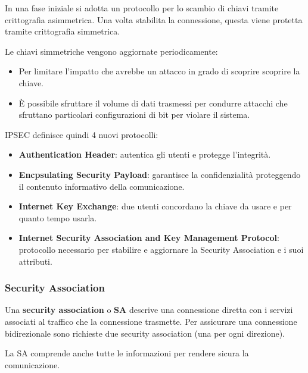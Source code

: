 In una fase iniziale si adotta un protocollo per lo scambio di chiavi tramite crittografia asimmetrica. Una volta
stabilita la connessione, questa viene protetta tramite crittografia simmetrica.

Le chiavi simmetriche vengono aggiornate periodicamente:
\begin{itemize}
	\item Per limitare l'impatto che avrebbe un attacco in grado di scoprire scoprire la chiave.
	\item \`E possibile sfruttare il volume di dati trasmessi per condurre attacchi che sfruttano particolari
	      configurazioni di bit per violare il sistema.
\end{itemize}
IPSEC definisce quindi 4 nuovi protocolli:
\begin{itemize}
	\item \textbf{Authentication Header}: autentica gli utenti e protegge l'integrità.
	\item \textbf{Encpsulating Security Payload}: garantisce la confidenzialità proteggendo il contenuto informativo
	      della comunicazione.
	\item \textbf{Internet Key Exchange}: due utenti concordano la chiave da usare e per quanto tempo usarla.
	\item \textbf{Internet Security Association and Key Management Protocol}: protocollo necessario per stabilire e
	      aggiornare la Security Association e i suoi attributi.
\end{itemize}

\subsubsection{Security Association}
Una \textbf{security association} o \textbf{SA} descrive una connessione diretta con i servizi associati al traffico
che la connessione trasmette. Per assicurare una connessione bidirezionale sono richieste due security association
(una per ogni direzione).

La SA comprende anche tutte le informazioni per rendere sicura la comunicazione.
